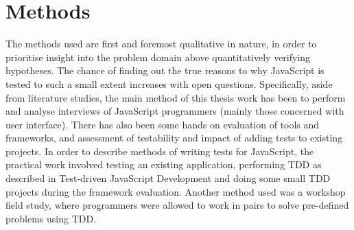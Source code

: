 \documentclass[11pt]{article}
\begin{document}
\section{Methods}

The methods used are first and foremost qualitative in nature, in order to prioritise insight into the problem domain above quantitatively verifying hypotheses. The chance of finding out the true reasons to why JavaScript is tested to such a small extent increases with open questions. Specifically, aside from literature studies, the main method of this thesis work has been to perform and analyse interviews of JavaScript programmers (mainly those concerned with user interface). There has also been some hands on evaluation of tools and frameworks, and assessment of testability and impact of adding tests to existing projects. In order to describe methods of writing tests for JavaScript, the practical work involved testing an existing application, performing TDD as described in Test-driven JavaScript Development\cite{Tddjs} and doing some small TDD projects during the framework evaluation. Another method used was a workshop field study, where programmers were allowed to work in pairs to solve pre-defined problems using TDD.
\end{document}
